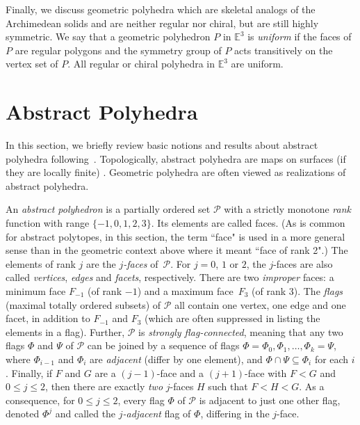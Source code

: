 \documentclass[12pt]{article}
\theoremstyle{definition}\newtheorem{definition}{Definition}[section]
\begin{document}
Finally, we discuss geometric polyhedra which are skeletal analogs of the Archimedean solids and are neither regular nor chiral, but are still highly symmetric. We say that a geometric polyhedron $P$ in $\mathbb{E}^3$ is \textit{uniform} if the faces of $P$ are regular polygons and the symmetry group of $P$ acts transitively on the vertex set of $P$. All regular or chiral polyhedra in $\mathbb{E}^3$ are uniform. 
\smallskip

\section{Abstract Polyhedra}
\label{abpo}

In this section, we briefly review basic notions and results about abstract polyhedra following~\cite{41}. Topologically, abstract polyhedra are maps on surfaces (if they are locally finite) \cite{Conder}. Geometric polyhedra are often viewed as realizations of abstract polyhedra. 
\smallskip
 
An {\em abstract polyhedron\/} is a partially ordered set $\mathcal{P}$ with a strictly monotone {\em rank\/} function with range $\{-1,0,1,2,3\}$. Its elements are called faces. (As is common for abstract polytopes, in this section, the term ``face" is used in a more general sense than in the geometric context above where it meant ``face of rank 2".)  The elements of rank $j$ are the {\em $j$-faces\/} of~$\mathcal{P}$. For $j = 0$, $1$ or $2$, the $j$-faces are also called {\em vertices}, {\em edges\/} and {\em facets\/}, respectively. There are two \textit{improper} faces: a minimum face $F_{-1}$ (of rank $-1$) and a maximum face~$F_3$ (of rank $3$). The \textit{flags} (maximal totally ordered subsets) of $\mathcal{P}$ all contain one vertex, one edge and one facet, in addition to $F_{-1}$ and $F_3$ (which are often suppressed in listing the elements in a flag). Further, $\mathcal{P}$ is \textit{ strongly flag-connected}, meaning that any two flags $\Phi$ and $\Psi$ of $\mathcal{P}$ can be joined by a sequence of flags $\Phi = \Phi_{0},\Phi_{1},\ldots,\Phi_{k} =\Psi$, where $\Phi_{i-1}$ and $\Phi_{i}$ are {\em adjacent\/} (differ by one element), and $\Phi \cap\Psi \subseteq \Phi_{i}$ for each $i$. Finally, if $F$ and $G$ are a $(j-1)$-face and a $(j+1)$-face with $F < G$ and $0 \leq j \leq 2$, then there are exactly {\em two\/} $j$-faces $H$ such that $F < H < G$. As a consequence, for $0 \leq j \leq 2$, every flag $\Phi$ of $\mathcal{P}$ is adjacent to just one other flag, denoted $\Phi^j$ and called the \textit{$j$-adjacent} flag of $\Phi$, differing in the $j$-face.
\smallskip
\end{document}
